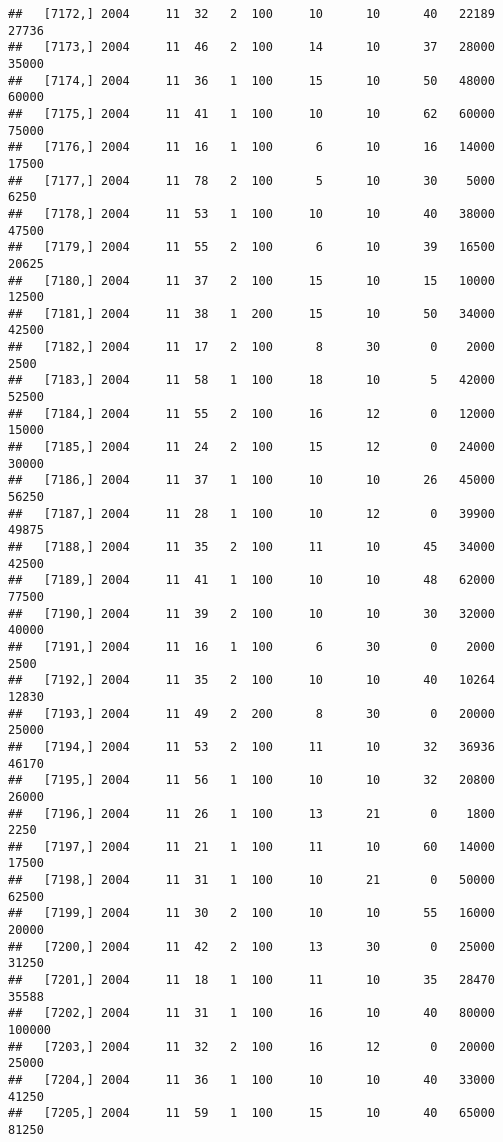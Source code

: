 \documentclass{article}\usepackage[]{graphicx}\usepackage[]{color}
\makeatletter
\newenvironment{kframe}{%
 \def\at@end@of@kframe{}%
 \ifinner\ifhmode%
  \def\at@end@of@kframe{\end{minipage}}%
  \begin{minipage}{\columnwidth}%
 \fi\fi%
 \def\FrameCommand##1{\hskip\@totalleftmargin \hskip-\fboxsep
 \colorbox{shadecolor}{##1}\hskip-\fboxsep
     \hskip-\linewidth \hskip-\@totalleftmargin \hskip\columnwidth}%
 \MakeFramed {\advance\hsize-\width
   \@totalleftmargin\z@ \linewidth\hsize
   \@setminipage}}%
 {\par\unskip\endMakeFramed%
 \at@end@of@kframe}
\newenvironment{knitrout}{}{} %
\makeatother
\begin{document}
\begin{knitrout}
\begin{kframe}
\begin{verbatim}
##   [7172,] 2004     11  32   2  100     10      10      40   22189   27736
##   [7173,] 2004     11  46   2  100     14      10      37   28000   35000
##   [7174,] 2004     11  36   1  100     15      10      50   48000   60000
##   [7175,] 2004     11  41   1  100     10      10      62   60000   75000
##   [7176,] 2004     11  16   1  100      6      10      16   14000   17500
##   [7177,] 2004     11  78   2  100      5      10      30    5000    6250
##   [7178,] 2004     11  53   1  100     10      10      40   38000   47500
##   [7179,] 2004     11  55   2  100      6      10      39   16500   20625
##   [7180,] 2004     11  37   2  100     15      10      15   10000   12500
##   [7181,] 2004     11  38   1  200     15      10      50   34000   42500
##   [7182,] 2004     11  17   2  100      8      30       0    2000    2500
##   [7183,] 2004     11  58   1  100     18      10       5   42000   52500
##   [7184,] 2004     11  55   2  100     16      12       0   12000   15000
##   [7185,] 2004     11  24   2  100     15      12       0   24000   30000
##   [7186,] 2004     11  37   1  100     10      10      26   45000   56250
##   [7187,] 2004     11  28   1  100     10      12       0   39900   49875
##   [7188,] 2004     11  35   2  100     11      10      45   34000   42500
##   [7189,] 2004     11  41   1  100     10      10      48   62000   77500
##   [7190,] 2004     11  39   2  100     10      10      30   32000   40000
##   [7191,] 2004     11  16   1  100      6      30       0    2000    2500
##   [7192,] 2004     11  35   2  100     10      10      40   10264   12830
##   [7193,] 2004     11  49   2  200      8      30       0   20000   25000
##   [7194,] 2004     11  53   2  100     11      10      32   36936   46170
##   [7195,] 2004     11  56   1  100     10      10      32   20800   26000
##   [7196,] 2004     11  26   1  100     13      21       0    1800    2250
##   [7197,] 2004     11  21   1  100     11      10      60   14000   17500
##   [7198,] 2004     11  31   1  100     10      21       0   50000   62500
##   [7199,] 2004     11  30   2  100     10      10      55   16000   20000
##   [7200,] 2004     11  42   2  100     13      30       0   25000   31250
##   [7201,] 2004     11  18   1  100     11      10      35   28470   35588
##   [7202,] 2004     11  31   1  100     16      10      40   80000  100000
##   [7203,] 2004     11  32   2  100     16      12       0   20000   25000
##   [7204,] 2004     11  36   1  100     10      10      40   33000   41250
##   [7205,] 2004     11  59   1  100     15      10      40   65000   81250

\end{verbatim}
\end{kframe}
\end{knitrout}
\end{document}
